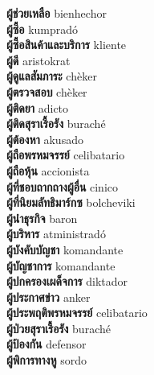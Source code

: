 \textbf{ ผู้ช่วยเหลือ  } bienhechor \\
\textbf{ ผู้ซื้อ  } kumpradó \\
\textbf{ ผู้ซื้อสินค้าและบริการ  } kliente \\
\textbf{ ผู้ดี  } aristokrat \\
\textbf{ ผู้ดูแลสัมภาระ  } chèker \\
\textbf{ ผู้ตรวจสอบ  } chèker \\
\textbf{ ผู้ติดยา  } adicto \\
\textbf{ ผู้ติดสุราเรื้อรัง  } buraché \\
\textbf{ ผู้ต้องหา  } akusado \\
\textbf{ ผู้ถือพรหมจรรย์  } celibatario \\
\textbf{ ผู้ถือหุ้น  } accionista \\
\textbf{ ผู้ที่ชอบถากถางผู้อื่น  } cinico \\
\textbf{ ผู้ที่นิยมลัทธิมาร์กซ  } bolcheviki \\
\textbf{ ผู้นำธุรกิจ  } baron \\
\textbf{ ผู้บริหาร  } atministradó \\
\textbf{ ผู้บังคับบัญชา  } komandante \\
\textbf{ ผู้บัญชาการ  } komandante \\
\textbf{ ผู้ปกครองเผด็จการ  } diktador \\
\textbf{ ผู้ประกาศข่าว  } anker \\
\textbf{ ผู้ประพฤติพรหมจรรย์  } celibatario \\
\textbf{ ผู้ป่วยสุราเรื้อรัง  } buraché \\
\textbf{ ผู้ป้องกัน  } defensor \\
\textbf{ ผู้พิการทางหู  } sordo \\
